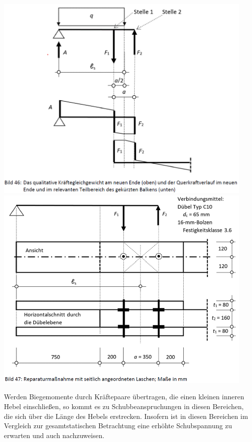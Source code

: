 \documentclass[fleqn,twoside]{article}
\begin{document}
        \begin{minipage}{0.45\textwidth}
            \includegraphics[width=0.95\textwidth]{Grafiken/Denkmalpflegerische Arbeit/Balkenkopfreparatur 2.png}\\
            \includegraphics[width=0.95\textwidth]{Grafiken/Denkmalpflegerische Arbeit/Balkenkopfreparatur 3.png}
        \end{minipage}
        
        \vspace*{3mm}
        
        Werden Biegemomente durch Kräftepaare übertragen, die einen kleinen inneren Hebel einschließen, so kommt es zu Schubbeanspruchungen in diesen Bereichen, die sich über die Länge des Hebels erstrecken. Insofern ist in diesen Bereichen im Vergleich zur gesamtstatischen Betrachtung eine erhöhte Schubspannung zu erwarten und auch nachzuweisen. \\
            
\end{document}
